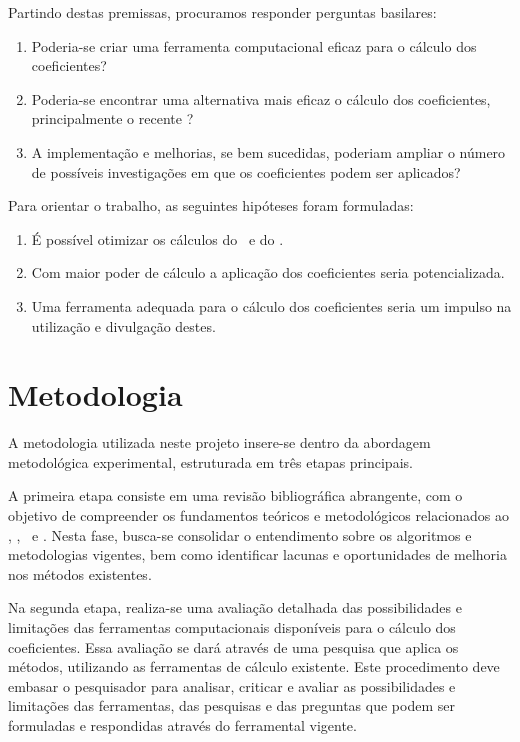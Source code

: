 Partindo destas premissas, procuramos responder perguntas basilares:

\begin{enumerate}
    \label{enum:quest}
    \item Poderia-se criar uma ferramenta computacional eficaz para o cálculo dos coeficientes?
    \item Poderia-se encontrar uma alternativa mais eficaz o cálculo dos coeficientes, principalmente o recente \dmc?
    \item A implementação e melhorias, se bem sucedidas, poderiam ampliar o número de possíveis investigações em que os coeficientes podem ser aplicados?
\end{enumerate}

Para orientar o trabalho, as seguintes hipóteses foram formuladas:

\begin{enumerate}
    \item É possível otimizar os cálculos do \pdcca~e do \dmc.
    \item Com maior poder de cálculo a aplicação dos coeficientes seria potencializada.
	\item Uma ferramenta adequada para o cálculo dos coeficientes seria um impulso na utilização e divulgação destes.
\end{enumerate}

\section{Metodologia}
\label{sec:metodologia}

A metodologia utilizada neste projeto insere-se dentro da abordagem metodológica experimental, estruturada em três etapas principais.

A primeira etapa consiste em uma revisão bibliográfica abrangente, com o objetivo de compreender os fundamentos teóricos e metodológicos relacionados ao \dfa, \dcca, \pdcca~e \dmc. Nesta fase, busca-se consolidar o entendimento sobre os algoritmos e metodologias vigentes, bem como identificar lacunas e oportunidades de melhoria nos métodos existentes.

Na segunda etapa, realiza-se uma avaliação detalhada das possibilidades e limitações das ferramentas computacionais disponíveis para o cálculo dos coeficientes. Essa avaliação se dará através de uma pesquisa que aplica os métodos, utilizando as ferramentas de cálculo existente. Este procedimento deve embasar o pesquisador para analisar, criticar e avaliar as possibilidades e limitações das ferramentas, das pesquisas e das preguntas que podem ser formuladas e respondidas através do ferramental vigente.

